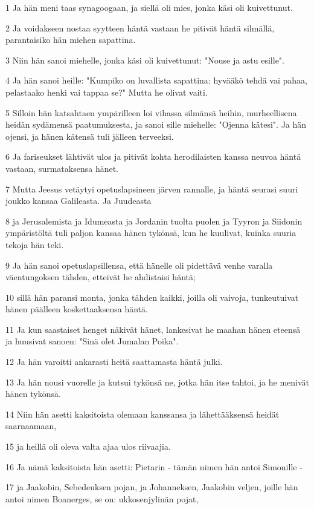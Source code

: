 \par 1 Ja hän meni taas synagoogaan, ja siellä oli mies, jonka käsi oli kuivettunut.
\par 2 Ja voidakseen nostaa syytteen häntä vastaan he pitivät häntä silmällä, parantaisiko hän miehen sapattina.
\par 3 Niin hän sanoi miehelle, jonka käsi oli kuivettunut: "Nouse ja astu esille".
\par 4 Ja hän sanoi heille: "Kumpiko on luvallista sapattina: hyvääkö tehdä vai pahaa, pelastaako henki vai tappaa se?" Mutta he olivat vaiti.
\par 5 Silloin hän katsahtaen ympärilleen loi vihassa silmänsä heihin, murheellisena heidän sydämensä paatumuksesta, ja sanoi sille miehelle: "Ojenna kätesi". Ja hän ojensi, ja hänen kätensä tuli jälleen terveeksi.
\par 6 Ja fariseukset lähtivät ulos ja pitivät kohta herodilaisten kanssa neuvoa häntä vastaan, surmataksensa hänet.
\par 7 Mutta Jeesus vetäytyi opetuslapsineen järven rannalle, ja häntä seurasi suuri joukko kansaa Galileasta. Ja Juudeasta
\par 8 ja Jerusalemista ja Idumeasta ja Jordanin tuolta puolen ja Tyyron ja Siidonin ympäristöltä tuli paljon kansaa hänen tykönsä, kun he kuulivat, kuinka suuria tekoja hän teki.
\par 9 Ja hän sanoi opetuslapsillensa, että hänelle oli pidettävä venhe varalla väentungoksen tähden, etteivät he ahdistaisi häntä;
\par 10 sillä hän paransi monta, jonka tähden kaikki, joilla oli vaivoja, tunkeutuivat hänen päälleen koskettaaksensa häntä.
\par 11 Ja kun saastaiset henget näkivät hänet, lankesivat he maahan hänen eteensä ja huusivat sanoen: "Sinä olet Jumalan Poika".
\par 12 Ja hän varoitti ankarasti heitä saattamasta häntä julki.
\par 13 Ja hän nousi vuorelle ja kutsui tykönsä ne, jotka hän itse tahtoi, ja he menivät hänen tykönsä.
\par 14 Niin hän asetti kaksitoista olemaan kanssansa ja lähettääksensä heidät saarnaamaan,
\par 15 ja heillä oli oleva valta ajaa ulos riivaajia.
\par 16 Ja nämä kaksitoista hän asetti: Pietarin - tämän nimen hän antoi Simonille -
\par 17 ja Jaakobin, Sebedeuksen pojan, ja Johanneksen, Jaakobin veljen, joille hän antoi nimen Boanerges, se on: ukkosenjylinän pojat,
